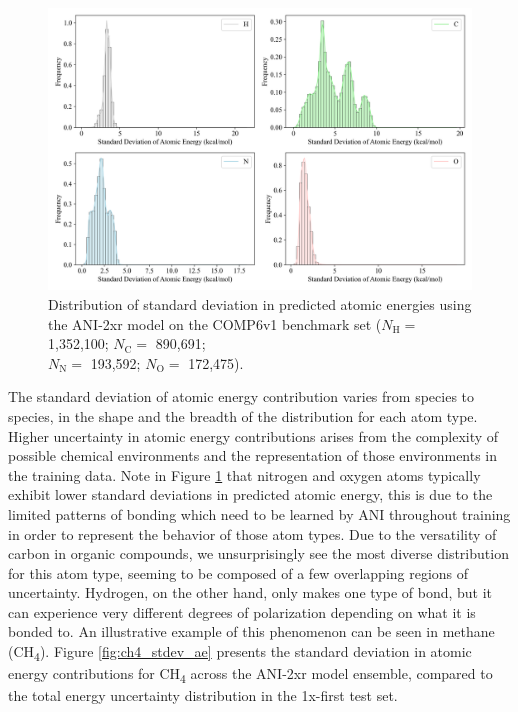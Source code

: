 \begin{figure}[H]
    \centering
    \includegraphics[width=1\linewidth]{Images/2xr_outputs/2xr_comp6v1_stdev-ae-per-atomtype.png}
    \caption[Standard deviation in predicted atomic energy contribution for H, C, N, O atom types]{Distribution of standard deviation in predicted atomic energies using the ANI-2xr model on the COMP6v1 benchmark set ($N_\text{H}=$ 1,352,100; 
    $N_\text{C}=$ 890,691;\\ 
    $N_\text{N}=$ 193,592; 
    $N_\text{O}=$ 172,475).}
    \label{fig:2xr_comp6v1_stdev-ae-per-atomtype}
\end{figure}

The standard deviation of atomic energy contribution varies from species to species, in the shape and the breadth of the distribution for each atom type.
Higher uncertainty in atomic energy contributions arises from the complexity of possible chemical environments and the representation of those environments in the training data.
Note in Figure \ref{fig:2xr_comp6v1_stdev-ae-per-atomtype} that nitrogen and oxygen atoms typically exhibit lower standard deviations in predicted atomic energy, this is due to the limited patterns of bonding which need to be learned by ANI throughout training in order to represent the behavior of those atom types.
Due to the versatility of carbon in organic compounds, we unsurprisingly see the most diverse distribution for this atom type, seeming to be composed of a few overlapping regions of uncertainty. 
Hydrogen, on the other hand, only makes one type of bond, but it can experience very different degrees of polarization depending on what it is bonded to. 
An illustrative example of this phenomenon can be seen in methane (CH\textsubscript{4}). 
Figure \ref{fig:ch4_stdev_ae} presents the standard deviation in atomic energy contributions for CH\textsubscript{4} across the ANI-2xr model ensemble, compared to the total energy uncertainty distribution in the 1x-first test set.

